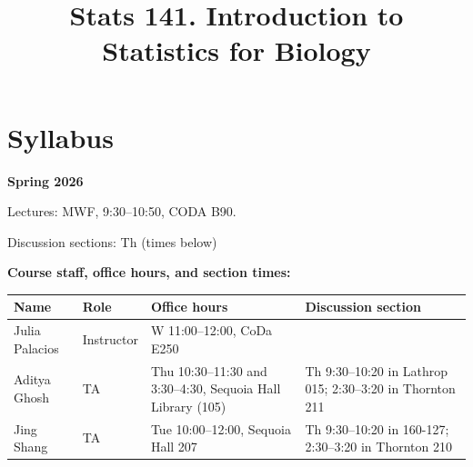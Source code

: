 \documentclass[
  letterpaper,
  DIV=11,
  numbers=noendperiod]{scrreprt}
\title{Stats 141. Introduction to Statistics for Biology}
\author{}
\date{}
\newcounter{none} %
\renewcommand*\contentsname{Table of contents}
\newcommand\contentsname{Table of contents}
\begin{document}
\maketitle

\renewcommand*\contentsname{Table of contents}
{
\setcounter{tocdepth}{2}
\tableofcontents
}


\chapter*{Syllabus}\label{syllabus}


\textbf{Spring 2026}

Lectures: MWF, 9:30--10:50, CODA B90.

Discussion sections: Th (times below)

\textbf{Course staff, office hours, and section times:}

{\def\LTcaptype{none} %
\begin{longtable}[]{@{}
  >{\raggedright\arraybackslash}p{}
  >{\raggedright\arraybackslash}p{}
  >{\raggedright\arraybackslash}p{}
  >{\raggedright\arraybackslash}p{}@{}}
\toprule\noalign{}
\begin{minipage}[b]{\linewidth}\raggedright
Name
\end{minipage} & \begin{minipage}[b]{\linewidth}\raggedright
Role
\end{minipage} & \begin{minipage}[b]{\linewidth}\raggedright
Office hours
\end{minipage} & \begin{minipage}[b]{\linewidth}\raggedright
Discussion section
\end{minipage} \\
\midrule\noalign{}
\endhead
\bottomrule\noalign{}
\endlastfoot
Julia Palacios & Instructor & W 11:00--12:00, CoDa E250 & \\
Aditya Ghosh & TA & Thu 10:30--11:30 and 3:30--4:30, Sequoia Hall
Library (105) & Th 9:30--10:20 in Lathrop 015; 2:30--3:20 in Thornton
211 \\
Jing Shang & TA & Tue 10:00--12:00, Sequoia Hall 207 & Th 9:30--10:20 in
160-127; 2:30--3:20 in Thornton 210 \\
\end{longtable}
}
\end{document}
